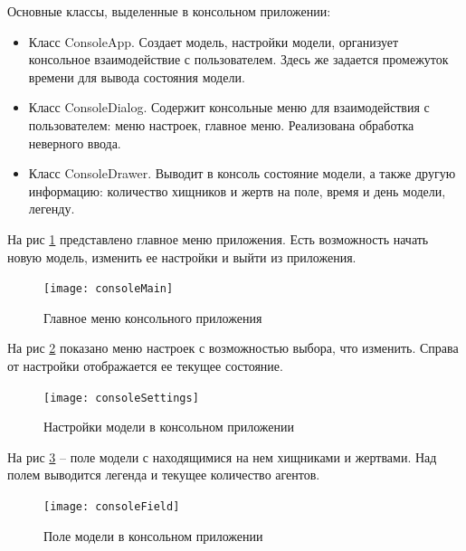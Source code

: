 \documentclass[a4paper]{article}
\begin{document}
\noindent Основные классы, выделенные в консольном приложении:
\begin{itemize}
\item Класс ConsoleApp. Создает модель, настройки модели, организует консольное взаимодействие с пользователем. Здесь же задается промежуток времени для вывода состояния модели.
\item Класс ConsoleDialog. Содержит консольные меню для взаимодействия с пользователем: меню настроек, главное меню. Реализована обработка неверного ввода. 
\item Класс ConsoleDrawer. Выводит в консоль состояние модели, а также другую информацию: количество хищников и жертв на поле, время и день модели, легенду. 
\end{itemize}

На рис \ref{pic:consoleMain} представлено главное меню приложения. Есть возможность начать новую модель, изменить ее настройки и выйти из приложения. 

\begin{figure}[H]
	\begin{center}
		\texttt{[image: consoleMain]}
		\caption{Главное меню консольного приложения} 
		\label{pic:consoleMain} %
	\end{center}
\end{figure}

На рис \ref{pic:consoleSettings} показано меню настроек с возможностью выбора, что изменить. Справа от настройки отображается ее текущее состояние.

\begin{figure}[H]
	\begin{center}
		\texttt{[image: consoleSettings]}
		\caption{Настройки модели в консольном приложении} 
		\label{pic:consoleSettings} %
	\end{center}
\end{figure}

На рис \ref{pic:consoleField} – поле модели с находящимися на нем хищниками и жертвами. Над полем выводится легенда и текущее количество агентов. 

\begin{figure}[H]
	\begin{center}
		\texttt{[image: consoleField]}
		\caption{Поле модели в консольном приложении} 
		\label{pic:consoleField} %
	\end{center}
\end{figure}
\end{document}
